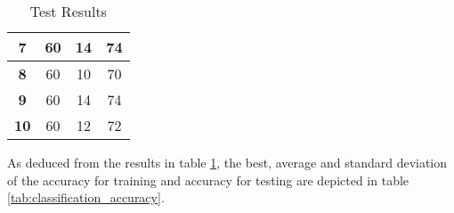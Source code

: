 \begin{table}[H]
{\begin{tabular}{|c|c|c|c|}
\textbf{7}   & 60                                                                                   & 14                                                                                    & 74                                                                                 \\ \hline
\textbf{8}   & 60                                                                                   & 10                                                                                    & 70                                                                                 \\ \hline
\textbf{9}   & 60                                                                                   & 14                                                                                    & 74                                                                                 \\ \hline
\textbf{10}  & 60                                                                                   & 12                                                                                    & 72                                                                                 \\ \hline
\end{tabular}}
\caption{Test Results}
\label{tab:test_results}
\end{table}

As deduced from the results in table \ref{tab:test_results}, the best, average and standard deviation of the accuracy for training and accuracy for testing are depicted in table \ref{tab:classification_accuracy}.

\begin{table}[H]
\caption{Classification Accuracy}
\label{tab:classification_accuracy}
\end{table}